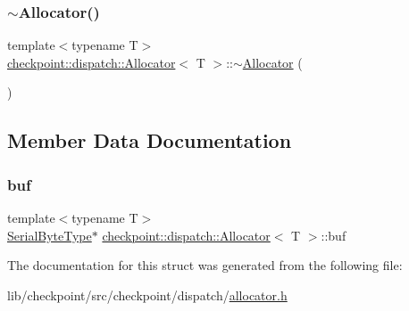 \mbox{\label{structcheckpoint_1_1dispatch_1_1_allocator_a7048344a23ba3b7bd0fa2ed0123586e5}} 
\subsubsection{\texorpdfstring{$\sim$\+Allocator()}{~Allocator()}}
{\footnotesize\ttfamily template$<$typename T$>$ \\
\hyperlink{structcheckpoint_1_1dispatch_1_1_allocator}{checkpoint\+::dispatch\+::\+Allocator}$<$ T $>$\+::$\sim$\hyperlink{structcheckpoint_1_1dispatch_1_1_allocator}{Allocator} (\begin{DoxyParamCaption}{ }\end{DoxyParamCaption})\hspace{0.3cm}{\ttfamily [inline]}}



\subsection{Member Data Documentation}
\mbox{\label{structcheckpoint_1_1dispatch_1_1_allocator_a3d770c2b7a033aff92ba603be5b1027f}} 
\subsubsection{\texorpdfstring{buf}{buf}}
{\footnotesize\ttfamily template$<$typename T$>$ \\
\hyperlink{namespacecheckpoint_ae57f01cdc0b81776c23b6c7c934c58f5}{Serial\+Byte\+Type}$\ast$ \hyperlink{structcheckpoint_1_1dispatch_1_1_allocator}{checkpoint\+::dispatch\+::\+Allocator}$<$ T $>$\+::buf}



The documentation for this struct was generated from the following file\+:\begin{DoxyCompactItemize}
\item 
lib/checkpoint/src/checkpoint/dispatch/\hyperlink{allocator_8h}{allocator.\+h}\end{DoxyCompactItemize}
